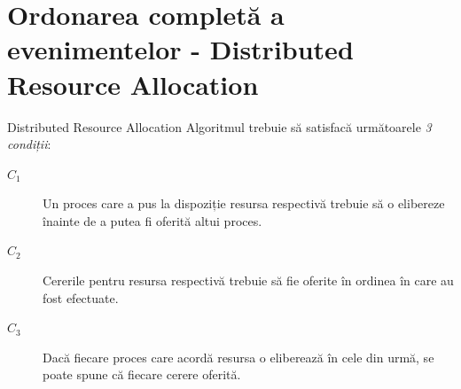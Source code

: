 \documentclass[9pt]{beamer}
\newtheorem{concept}{Concept nou}
\begin{document}
\section[]{Ordonarea completă a evenimentelor - Distributed Resource Allocation}


\begin{frame}{Distributed Resource Allocation}
\Large{Algoritmul trebuie să satisfacă următoarele \textit{3 condiții}:}
    \begin{description}
        \item[$C_1$] Un proces care a pus la dispoziție resursa respectivă trebuie să o elibereze înainte de a putea fi oferită altui proces.
        \vskip5pt
        \item[$C_2$] Cererile pentru resursa respectivă trebuie să fie oferite în ordinea în care au fost efectuate.
        \vskip5pt
        \item[$C_3$] Dacă fiecare proces care acordă resursa o eliberează în cele din urmă, se poate spune că fiecare cerere oferită.
    \end{description}
\end{frame}
\end{document}

